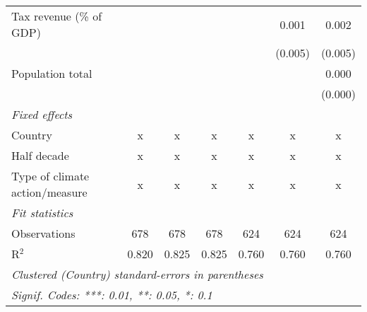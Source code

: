 \begin{tabular}{lcccccc}
   Tax revenue (\% of GDP)                                      &               &                &                &                & 0.001          & 0.002\\   
                                                                &               &                &                &                & (0.005)        & (0.005)\\   
   Population total                                             &               &                &                &                &                & 0.000\\   
                                                                &               &                &                &                &                & (0.000)\\   
   \emph{Fixed effects}\\
   Country                                                      & x             & x              & x              & x              & x              & x\\  
   Half decade                                                  & x             & x              & x              & x              & x              & x\\  
   Type of climate action/measure                               & x             & x              & x              & x              & x              & x\\  
   \midrule \emph{Fit statistics}\\
   Observations                                                 & 678           & 678            & 678            & 624            & 624            & 624\\  
   R$^2$                                                        & 0.820         & 0.825          & 0.825          & 0.760          & 0.760          & 0.760\\  
   \midrule
   \multicolumn{7}{l}{\emph{Clustered (Country) standard-errors in parentheses}}\\
   \multicolumn{7}{l}{\emph{Signif. Codes: ***: 0.01, **: 0.05, *: 0.1}}\\
\end{tabular}
\par\endgroup


